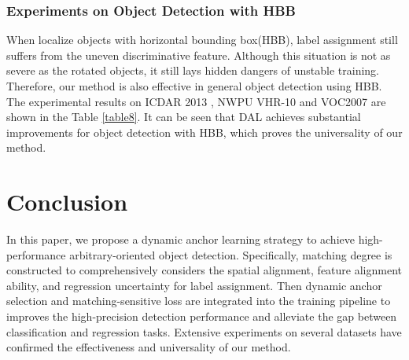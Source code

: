 \documentclass[letterpaper]{article} \usepackage{aaai21}  \usepackage{times}  \usepackage{helvet} \usepackage{courier}  \usepackage[hyphens]{url}  \usepackage{graphicx} \urlstyle{rm} \def\UrlFont{\rm}  \usepackage{natbib}  \usepackage{caption} \frenchspacing  \setlength{\pdfpagewidth}{8.5in}  \setlength{\pdfpageheight}{11in}  \usepackage{url}
\begin{document}
\subsubsection{Experiments on Object Detection with HBB}
When localize objects with horizontal bounding box(HBB),  label assignment still suffers from the uneven discriminative feature. Although this situation is not as severe as the rotated objects, it still lays hidden dangers of unstable training. Therefore, our method is also effective in general object detection using HBB. The experimental results on ICDAR 2013 \cite{karatzas2013icdar}, NWPU VHR-10 \cite{cheng2016learning} and VOC2007 \cite{everingham2010pascal}  are shown in the Table \ref{table8}. It can be seen that DAL achieves  substantial improvements for object detection with HBB, which proves the universality of our method.
\section{Conclusion}
In this paper, we propose a dynamic anchor learning strategy to achieve high-performance arbitrary-oriented object detection. Specifically,  matching degree is constructed to comprehensively considers the spatial alignment, feature alignment ability, and regression uncertainty for label assignment. Then dynamic anchor selection and matching-sensitive loss are integrated into the training pipeline to improves the high-precision detection performance and alleviate the gap between classification and regression tasks. Extensive experiments on several datasets have confirmed the effectiveness and universality of our method.

\end{document}
